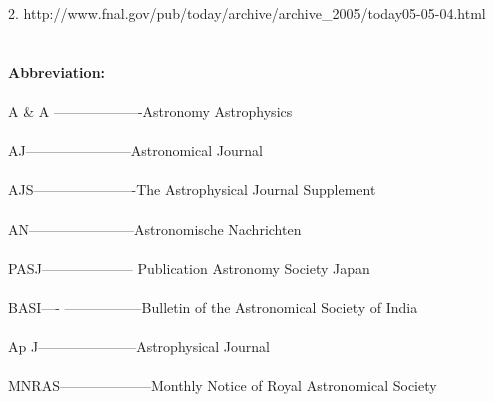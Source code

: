 2. http://www.fnal.gov/pub/today/archive/archive\_2005/today05-05-04.html\\\\\\
\textbf{\Large{Abbreviation:}}\\\\
A \& A -------------------Astronomy Astrophysics\\\\
AJ-----------------------Astronomical Journal\\\\
AJS----------------------The Astrophysical Journal Supplement\\\\
AN-----------------------Astronomische Nachrichten\\\\
PASJ-------------------- Publication Astronomy Society Japan\\\\
BASI----	-----------------Bulletin of the Astronomical Society of India\\\\
Ap J---------------------Astrophysical Journal\\\\
MNRAS--------------------Monthly Notice of Royal Astronomical Society\\\\




















